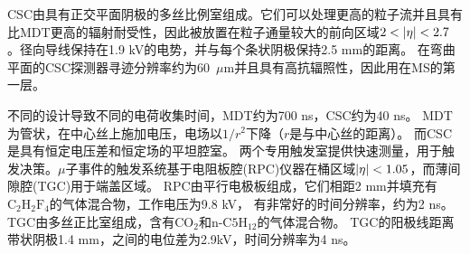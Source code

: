 CSC由具有正交平面阴极的多丝比例室组成。它们可以处理更高的粒子流并且具有比MDT更高的辐射耐受性，因此被放置在粒子通量较大的前向区域$2<\abseta<2.7$。径向导线保持在1.9 kV的电势，并与每个条状阴极保持2.5 mm的距离。
在弯曲平面的CSC探测器寻迹分辨率约为60~$\mu\text{m}$并且具有高抗辐照性，因此用在MS的第一层。

不同的设计导致不同的电荷收集时间，MDT约为700 ns，CSC约为40 ns。
MDT为管状，在中心丝上施加电压，电场以$1/r^{2}$下降（$r$是与中心丝的距离）。
而CSC是具有恒定电压差和恒定场的平坦腔室。
两个专用触发室提供快速测量，用于触发决策。$\mu$子事件的触发系统基于电阻板腔(RPC)\cite{Aielli:2006hg}仪器在桶区域$|\eta|<1.05$，而薄间隙腔(TGC)\cite{Majewski:1984ag}用于端盖区域。 
RPC由平行电极板组成，它们相距2 mm并填充有$\text{C}_{2}\text{H}_{2}\text{F}_{4}$的气体混合物，工作电压为9.8 kV，
有非常好的时间分辨率，约为2 ns。TGC由多丝正比室组成，含有$\text{CO}_{2}$和$\text{n-C5H}_{12}$的气体混合物。
TGC的阳极线距离带状阴极1.4 mm，之间的电位差为2.9kV，时间分辨率为4 ns。
